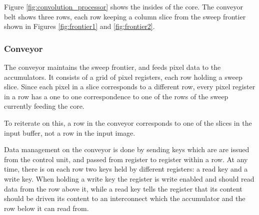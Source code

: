 Figure \ref{fig:convolution_processor} shows the insides of the core. 
The conveyor belt shows three rows, each row keeping a column slice from the sweep frontier shown in Figures \ref{fig:frontier1} and \ref{fig:frontier2}.

\subsubsection{Conveyor}
The conveyor maintains the sweep frontier, and feeds pixel data to the accumulators.
It consists of a grid of pixel registers, each row holding a sweep slice.
Since each pixel in a slice corresponds to a different row, every pixel register in a row has a one to one correspondence to one of the rows of the sweep currently feeding the core.

To reiterate on this, a row in the conveyor corresponds to one of the slices in the input buffer, not a row in the input image.

Data management on the conveyor is done by sending keys which are are issued from the control unit, and passed from register to register within a row.
At any time, there is on each row two keys held by different registers: a read key and a write key.
When holding a write key the register is write enabled and should read data from the row above it, while a read key tells the register that its content should be driven its content to an interconnect which the accumulator and the row below it can read from.

